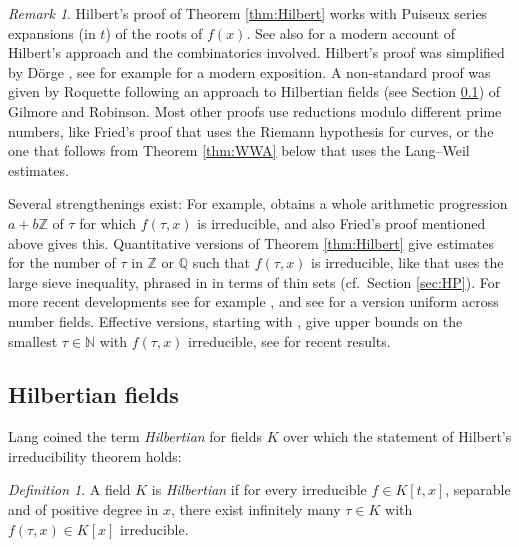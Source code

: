 \documentclass[10pt,a4paper]{amsart}
\theoremstyle{plain}
\theoremstyle{remark}
\newtheorem{definition}[theorem]{Definition}
\newtheorem{remark}[theorem]{Remark}
\numberwithin{theorem}{section}
\begin{document}
\begin{remark}
Hilbert's proof of Theorem \ref{thm:Hilbert} works with Puiseux series expansions (in $t$) of the roots of $f(x)$. See also \cite{VGR} for a modern account of Hilbert's approach and the combinatorics involved.
Hilbert's proof was simplified by Dörge \cite{Dörge}, see for example \cite{Völklein} for a modern exposition.
A non-standard proof was given by Roquette \cite{Roquette} following an approach to Hilbertian fields (see Section \ref{sec:Hilbertian}) of Gilmore and Robinson.
Most other proofs use reductions modulo different prime numbers, like 
Fried's proof \cite{Fried} that uses the Riemann hypothesis for curves,
or the one that follows from Theorem \ref{thm:WWA} below that uses the Lang--Weil estimates.

Several strengthenings exist:
For example, 
\cite{Schinzel} obtains a whole arithmetic progression $a+b\mathbb{Z}$
of $\tau$ for which $f(\tau,x)$ is irreducible,
and also Fried's proof mentioned above gives this.
Quantitative versions of Theorem \ref{thm:Hilbert}
give estimates for the number of $\tau$ in $\mathbb{Z}$ or $\mathbb{Q}$ such that $f(\tau,x)$ is irreducible, like \cite[Theorem 2.5]{Cohen} that uses the large sieve inequality, phrased in \cite[Theorem 3.4.4]{Serre} in terms of thin sets (cf.~Section \ref{sec:HP}).
For more recent developments see for example \cite{Zywina},
and see \cite{Zan98} for a version uniform across number fields. 
Effective versions, 
starting with \cite{Debes,SchinzelZannier},
give upper bounds on the smallest $\tau\in\mathbb{N}$ with $f(\tau,x)$ irreducible,
see \cite{PS,CDHNV} for recent results.
\end{remark}

\subsection{Hilbertian fields}
\label{sec:Hilbertian}

Lang \cite{Lang_diophantine_geometry} coined the term {\em Hilbertian} for fields $K$
over which the statement of Hilbert's irreducibility theorem holds:

\begin{definition}\label{def:Hilbertian}
A field $K$ is {\em Hilbertian}    
if for every irreducible $f\in K[t,x]$, separable and of positive degree in $x$,
there exist infinitely many $\tau \in K$ with $f(\tau,x)\in K[x]$ irreducible.
\end{definition}
\end{document}
